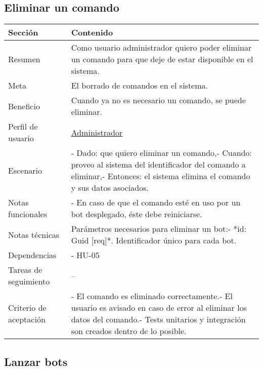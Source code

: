 \subsection{Eliminar un comando}

\begin{table}[H]
    \centering
    \begin{adjustbox}{max width=\textwidth}
    \begin{tabularx}{\textwidth}{|l|L|}
    \hline
        Sección & Contenido \\ \hline
        Resumen & Como usuario administrador quiero poder eliminar un comando para que deje de estar disponible en el sistema. \\ \hline
        Meta & El borrado de comandos en el sistema. \\ \hline
        Beneficio & Cuando ya no es necesario un comando, se puede eliminar. \\ \hline
        Perfil de usuario & \hyperref[sec:personaAdmin]{Administrador} \\ \hline
        Escenario & - Dado: que quiero eliminar un comando,\linebreak - Cuando: proveo al sistema del identificador del comando a eliminar,\linebreak - Entonces: el sistema elimina el comando y sus datos asociados. \\ \hline
        Notas funcionales & - En caso de que el comando esté en uso por un bot desplegado, éste debe reiniciarse. \\ \hline
        Notas técnicas & Parámetros necesarios para eliminar un bot:\linebreak - *id: Guid [req]*. Identificador único para cada bot. \\ \hline
        Dependencias & - HU-05 \\ \hline
        Tareas de seguimiento & – \\ \hline
        Criterio de aceptación & - El comando es eliminado correctamente.\linebreak - El usuario es avisado en caso de error al eliminar los datos del comando.\linebreak - Tests unitarios y integración son creados dentro de lo posible. \\ \hline
    \end{tabularx}
    \end{adjustbox}
\end{table}

\subsection{Lanzar bots}

